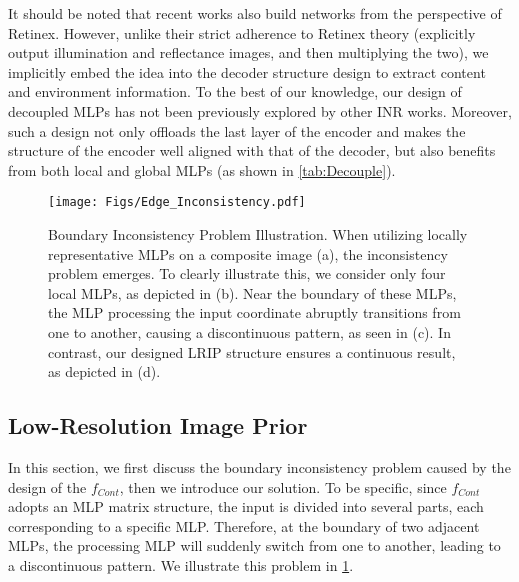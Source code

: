 \documentclass[10pt,journal,twocolumn,twoside]{IEEEtran}
\begin{document}
It should be noted that recent works \cite{guo2021intrinsic, guo2021image} also build networks from the perspective of Retinex. However, unlike their strict adherence to Retinex theory (explicitly output illumination and reflectance images, and then multiplying the two), we implicitly embed the idea into the decoder structure design to extract content and environment information. To the best of our knowledge, our design of decoupled MLPs has not been previously explored by other INR works. Moreover, such a design not only offloads the last layer of the encoder and makes the structure of the encoder well aligned with that of the decoder, but also benefits from both local and global MLPs (as shown in \cref{tab:Decouple}).


\begin{figure}[t]
  \centering
   \texttt{[image: Figs/Edge\_Inconsistency.pdf]}
   \caption{Boundary Inconsistency Problem Illustration. When utilizing locally representative MLPs on a composite image (a), the inconsistency problem emerges. To clearly illustrate this, we consider only four local MLPs, as depicted in (b). Near the boundary of these MLPs, the MLP processing the input coordinate abruptly transitions from one to another, causing a discontinuous pattern, as seen in (c). In contrast, our designed LRIP structure ensures a continuous result, as depicted in (d).}
   \label{fig:Edge_Inconsistency}
\end{figure}


\subsection{Low-Resolution Image Prior}
\label{subsec:LRIP}

In this section, we first discuss the boundary inconsistency problem caused by the design of the $f_{Cont}$, then we introduce our solution. To be specific, since $f_{Cont}$ adopts an MLP matrix structure, the input is divided into several parts, each corresponding to a specific MLP. Therefore, at the boundary of two adjacent MLPs, the processing MLP will suddenly switch from one to another, leading to a discontinuous pattern. We illustrate this problem in \cref{fig:Edge_Inconsistency}.
\end{document}

